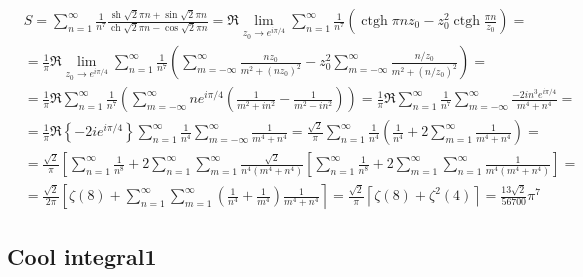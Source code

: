 	$$
	\begin{aligned}
		& S= \sum_{n=1}^{\infty} \frac{1}{n^7} \frac{\operatorname{sh} \sqrt{2} \pi n+\sin \sqrt{2} \pi n}{\operatorname{ch} \sqrt{2} \pi n-\cos \sqrt{2} \pi n}=\Re \lim _{z_0 \rightarrow e^{i \pi / 4}} \sum_{n=1}^{\infty} \frac{1}{n^7}\left(\operatorname{ctgh} \pi n z_0-z_0^2 \operatorname{ctgh} \frac{\pi n}{z_0}\right)= \\
		&=\frac{1}{\pi} \Re \lim _{z_0 \rightarrow e^{i \pi / 4}} \sum_{n=1}^{\infty} \frac{1}{n^7}\left(\sum_{m=-\infty}^{\infty} \frac{n z_0}{m^2+\left(n z_0\right)^2}-z_0^2 \sum_{m=-\infty}^{\infty} \frac{n / z_0}{m^2+\left(n / z_0\right)^2}\right)= \\
		&= \frac{1}{\pi} \Re \sum_{n=1}^{\infty} \frac{1}{n^7}\left(\sum_{m=-\infty}^{\infty} n e^{i \pi / 4}\left(\frac{1}{m^2+i n^2}-\frac{1}{m^2-i n^2}\right)\right)=\frac{1}{\pi} \Re \sum_{n=1}^{\infty} \frac{1}{n^7} \sum_{m=-\infty}^{\infty} \frac{-2 i n^3 e^{i \pi / 4}}{m^4+n^4}= \\
		&=\frac{1}{\pi} \Re\left\{-2 i e^{i \pi / 4}\right\} \sum_{n=1}^{\infty} \frac{1}{n^4} \sum_{m=-\infty}^{\infty} \frac{1}{m^4+n^4}=\frac{\sqrt{2}}{\pi} \sum_{n=1}^{\infty} \frac{1}{n^4}\left(\frac{1}{n^4}+2 \sum_{m=1}^{\infty} \frac{1}{m^4+n^4}\right)= \\
		&=\frac{\sqrt{2}}{\pi}\left[\sum_{n=1}^{\infty} \frac{1}{n^8}+2 \sum_{n=1}^{\infty} \sum_{m=1}^{\infty} \frac{\sqrt{2}}{n^4\left(m^4+n^4\right)}\left[\sum_{n=1}^{\infty} \frac{1}{n^8}+2 \sum_{m=1}^{\infty} \sum_{n=1}^{\infty} \frac{1}{m^4\left(m^4+n^4\right)}\right]=\right. \\
		&=\frac{\sqrt{2}}{2 \pi}\left[\zeta(8)+\sum_{n=1}^{\infty} \sum_{m=1}^{\infty}\left(\frac{1}{n^4}+\frac{1}{m^4}\right) \frac{1}{m^4+n^4}\right\rceil=\frac{\sqrt{2}}{\pi}\left\lceil\zeta(8)+\zeta^2(4)\right\rceil=\frac{13 \sqrt{2}}{56700} \pi^7
	\end{aligned}
	$$
	
	\subsection{Cool integral1}
	
